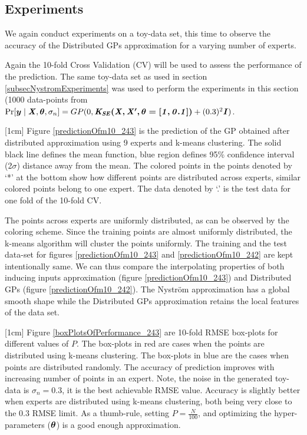 \subsection{Experiments}\label{subSecDistributedExperiments}
We again conduct experiments on a toy-data set, this time to observe the accuracy of the Distributed GPs approximation for a varying number of experts. 

Again the 10-fold Cross Validation (CV) will be used to assess the performance of the prediction. The same toy-data set as used in section \ref{subsecNystromExperiments} was used to perform the experiments in this section (1000 data-points from $\Pr[\boldsymbol{y} \mid \bm{\mathit{X}}, \boldsymbol{\theta}, \sigma_{n}] = GP(0, \bm{\mathit{K_{SE}(X, X', \theta = [1, 0.1])}} + (0.3)^{2}\bm{\mathit{I}})$.

[1cm]
Figure \ref{predictionOfm10_243} is the prediction of the GP obtained after distributed approximation using 9 experts and k-means clustering. The solid black line defines the mean function, blue region defines 95\% confidence interval (2$\sigma$) distance away from the mean. The colored points in the points denoted by `*' at the bottom show how different points are distributed across experts, similar colored points belong to one expert. The data denoted by `.' is the test data for one fold of the 10-fold CV. 

The points across experts are uniformly distributed, as can be observed by the coloring scheme. Since the training points are almost uniformly distributed, the k-means algorithm will cluster the points uniformly. The training and the test data-set for figures \ref{predictionOfm10_243} and \ref{predictionOfm10_242} are kept intentionally same. We can thus compare the interpolating properties of both inducing inputs approximation (figure \ref{predictionOfm10_243}) and Distributed GPs (figure \ref{predictionOfm10_242}). The Nystr\"{o}m approximation has a global smooth shape while the Distributed GPs approximation retains the local features of the data set. 

[1cm]
Figure \ref{boxPlotsOfPerformance_243} are 10-fold RMSE box-plots for different values of $P$. The box-plots in red are cases when the points are distributed using k-means clustering. The box-plots in blue are the cases when points are distributed randomly. The accuracy of prediction improves with increasing number of points in an expert. Note, the noise in the generated toy-data is $\sigma_{n}=0.3$, it is the best achievable RMSE value. Accuracy is slightly better when experts are distributed using k-means clustering, both being very close to the $0.3$ RMSE limit. As a thumb-rule, setting $P = \frac{N}{100}$, and optimizing the hyper-parameters ($\boldsymbol{\theta}$) is a good enough approximation. 


